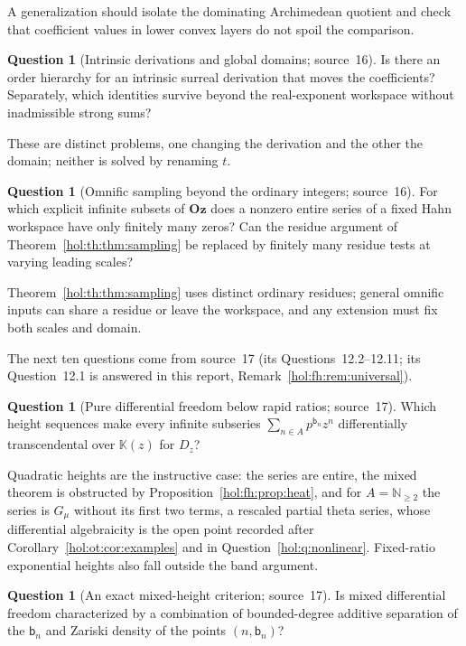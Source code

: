 \documentclass[11pt]{article}
\numberwithin{equation}{section}
\theoremstyle{definition}
\newtheorem{question}[theorem]{Question}
\theoremstyle{remark}
\newcommand{\N}{\mathbb N}
\newcommand{\KK}{\mathbb K}
\newcommand{\Oz}{\mathbf{Oz}}
\begin{document}
A generalization should isolate the dominating Archimedean quotient and check
that coefficient values in lower convex layers do not spoil the comparison.

\begin{question}[Intrinsic derivations and global domains; source~16]
\label{hol:th:q:intrinsic}
Is there an order hierarchy for an intrinsic surreal derivation that moves the
coefficients? Separately, which identities survive beyond the real-exponent
workspace without inadmissible strong sums?
\end{question}

These are distinct problems, one changing the derivation and the other the
domain; neither is solved by renaming $t$.

\begin{question}[Omnific sampling beyond the ordinary integers; source~16]
\label{hol:th:q:omnific}
For which explicit infinite subsets of $\Oz$ does a nonzero entire series of a
fixed Hahn workspace have only finitely many zeros? Can the residue argument of
Theorem~\ref{hol:th:thm:sampling} be replaced by finitely many residue tests
at varying leading scales?
\end{question}

Theorem~\ref{hol:th:thm:sampling} uses distinct ordinary residues; general
omnific inputs can share a residue or leave the workspace, and any extension
must fix both scales and domain.

The next ten questions come from source~17 (its Questions~12.2--12.11; its
Question~12.1 is answered in this report, Remark~\ref{hol:fh:rem:universal}).

\begin{question}[Pure differential freedom below rapid ratios; source~17]
\label{hol:fh:q:heights}
Which height sequences make every infinite subseries
$\sum_{n\in A}p^{\mathsf b_n}z^n$ differentially transcendental over $\KK(z)$
for $D_z$?
\end{question}

Quadratic heights are the instructive case: the series are entire, the mixed
theorem is obstructed by Proposition~\ref{hol:fh:prop:heat}, and for
$A=\N_{\ge2}$ the series is $G_\mu$ without its first two terms, a rescaled
partial theta series, whose differential
algebraicity is the open point recorded after
Corollary~\ref{hol:ot:cor:examples} and in Question~\ref{hol:q:nonlinear}.
Fixed-ratio exponential heights also fall outside the band argument.

\begin{question}[An exact mixed-height criterion; source~17]
\label{hol:fh:q:mixed}
Is mixed differential freedom characterized by a combination of
bounded-degree additive separation of the $\mathsf b_n$ and Zariski density of
the points $(n,\mathsf b_n)$?
\end{question}
\end{document}
